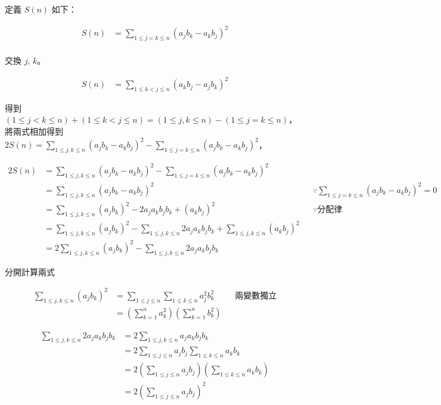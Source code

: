 \documentclass[11pt]{article}
\begin{document}
定義 $S(n)$ 如下：

\begin{equation}
\begin{split}
	S(n) &= \sum_{1 \le j < k \le n} (a_j b_k - a_k b_j)^2 \\
\end{split}
\end{equation}

交換 $j$, $k$。

\begin{equation}
\begin{split}
	S(n) &= \sum_{1 \le k < j \le n} (a_k b_j - a_j b_k)^2 
\end{split}
\end{equation}

得到 $(1 \le j < k \le n) + (1 \le k < j \le n) = (1 \le j, k \le n) - (1 \le j = k \le n)$，將兩式相加得到 $2S(n) = \sum_{1 \le j, k \le n} (a_j b_k - a_k b_j)^2 - \sum_{1 \le j = k \le n} (a_j b_k - a_k b_j)^2$，

\begin{align*}
	2S(n) &= \sum_{1 \le j, k \le n} (a_j b_k - a_k b_j)^2 - \sum_{1 \le j = k \le n} (a_j b_k - a_k b_j)^2 
			\\
		  &= \sum_{1 \le j, k \le n} (a_j b_k - a_k b_j)^2 
		  	&& \because \sum_{1 \le j = k \le n} (a_j b_k - a_k b_j)^2 = 0 \\
		  &= \sum_{1 \le j, k \le n} (a_j b_k)^2 - 2 a_j a_k b_j b_k + (a_k b_j)^2
		  	&& \because \text{分配律}\\
		  &= \sum_{1 \le j, k \le n} (a_j b_k)^2 - \sum_{1 \le j, k \le n} 2 a_j a_k b_j b_k 
		  	+ \sum_{1 \le j, k \le n} (a_k b_j)^2 \\
		  &= 2\sum_{1 \le j, k \le n} (a_j b_k)^2 - \sum_{1 \le j, k \le n} 2 a_j a_k b_j b_k 
\end{align*}

分開計算兩式

\begin{align*}
	\sum_{1 \le j, k \le n} (a_j b_k)^2 &= \sum_{1 \le j \le n} \sum_{1 \le k \le n} a_j^2 b_k^2 
			&& \text{兩變數獨立} \\
			&= \left ( \sum_{k=1}^{n} a_k^2 \right ) \left ( \sum_{k=1}^{n} b_k^2 \right )
\end{align*}

\begin{align*}
	\sum_{1 \le j, k \le n} 2 a_j a_k b_j b_k &= 2 \sum_{1 \le j, k \le n} a_j a_k b_j b_k \\
		&= 2 \sum_{1 \le j \le n} a_j b_j \sum_{1 \le k \le n} a_k b_k \\
		&= 2 \left ( \sum_{1 \le j \le n} a_j b_j \right ) \left ( \sum_{1 \le k \le n} a_k b_k \right ) \\
		&= 2 \left ( \sum_{1 \le j \le n} a_j b_j \right )^2
\end{align*}
\end{document}
